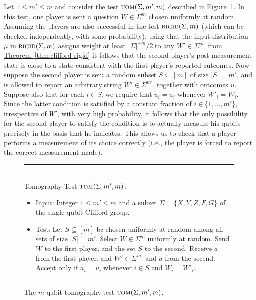 \documentclass[11pt]{article}
\numberwithin{equation}{section}
\theoremstyle{definition}
\theoremstyle{plain}
\newcommand{\ie}{i.\,e.}
\newcommand{\expref}[2]{\hyperref[#2]{#1~\ref{#2}}}
\newcommand{\rigid}{\textsc{rigid}}
\newcommand{\tom}{\textsc{tom}}
\begin{document}
Let $1\leq m'\leq m$ and consider the test $\tom(\Sigma,m',m)$ described in \expref{Figure}{fig:tomography-test}. In this test, one player is sent a question $W\in\Sigma^{m}$ chosen uniformly at random. Assuming the players are also successful in the test $\rigid(\Sigma,m)$ (which can be checked independently, with some probability), using that the input distribution $\mu$ in $\rigid(\Sigma,m)$ assigns weight at least $|\Sigma|^{-m}/2$ to any $W'\in \Sigma^{m}$, from \expref{Theorem}{thm:clifford-rigid} it follows that the second player's post-measurement state is close to a state consistent with the first player's reported outcomes. Now suppose the second player is sent a random subset $S\subseteq [m]$ of size $|S|=m'$, and is allowed to report an arbitrary string $W'\in \Sigma^{m'}$, together with outcomes $u$. Suppose also that for each $i\in S$, we require that $u_i=a_i$ whenever $W'_i=W_i$. Since the latter condition is satisfied by a constant fraction of $i\in\{1,\ldots,m'\}$, irrespective of $W'$, with very high probability, it follows that the only possibility for the second player to satisfy the condition is to actually measure his qubits precisely in the basis that he indicates. This allows us to check that a player performs a measurement of its choice correctly (\ie, the player is forced to report the correct measurement made).

\begin{figure}[H]
\rule[1ex]{\textwidth}{0.5pt}\\
Tomography Test $\tom(\Sigma,m',m)$: 
\begin{itemize}
    \item Input: Integer $1\leq m'\leq m$ and a subset $\Sigma = \{X,Y,Z,F,G\}$ of the single-qubit Clifford group. 
    \item Test: Let $S\subseteq [m]$ be chosen uniformly at random among all sets of size $|S|=m'$. Select $W\in\Sigma^{m}$ uniformly at random. Send $W$ to the first player, and the set $S$ to the second. Receive $a$ from the first player, and $W'\in\Sigma^{m'}$ and $u$ from the second. Accept only if $a_i=u_i$ whenever $i\in S$ and $W_i=W'_i$. 
\end{itemize}
\rule[2ex]{\textwidth}{0.5pt}\vspace{-.5cm}
\caption{The $m$-qubit tomography test $\tom(\Sigma,m',m)$.}
\label{fig:tomography-test}
\end{figure} 
\end{document}
